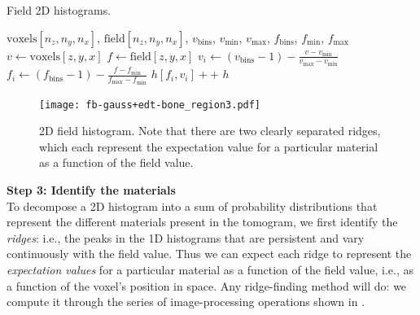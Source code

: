 \begin{algorithm}
    \caption{Field 2D histograms.}
    \label{alg:field-hist}
    \begin{algorithmic}
         {$\text{voxels}[n_z,n_y,n_x]$, $\text{field}[n_z,n_y,n_x]$, $v_\text{bins}$, $v_
        \text{min}$, $v_\text{max}$, $f_\text{bins}$, $f_\text{min}$, $f_\text{max}$}
                \State $v \gets \text{voxels}[z,y,x]$
                    \State $f \gets \text{field}[z,y,x]$
                        \State $v_i \gets (v_\text{bins} - 1) - \frac{v - v_\text{min}}{v_\text{max} - v_\text{min}}$
                        \State $f_i \gets (f_\text{bins} - 1) - \frac{f - f_\text{min}}{f_\text{max} - f_\text{min}}$
                        \State $h[f_i,v_i]{+}{+}$
                    \EndIf
                \EndIf
            \EndFor
            \State \Return $h$
        \EndFunction
    \end{algorithmic}
\end{algorithm}

\begin{figure}
    \texttt{[image: fb-gauss+edt-bone\_region3.pdf]}
    \caption{
        2D field histogram. Note that there are two clearly separated
        ridges, which each represent the expectation value for a particular
        material as a function of the field value.
    }
    \label{fig:field-hist}
\end{figure}

\vspace{\baselineskip}
\noindent\textbf{Step 3: Identify the materials} \\
To decompose a 2D histogram into a sum of probability distributions that
represent the different materials present in the tomogram, we first identify
the {\em ridges}: i.e., the peaks in the 1D histograms that are persistent and
vary continuously with the field value. Thus we can expect each ridge to
represent the {\em expectation values} for a particular material as a function
of the field value, i.e., as a function of the voxel's position in space.
%
Any ridge-finding method will do: we compute it through the series of
image-processing operations shown in .

